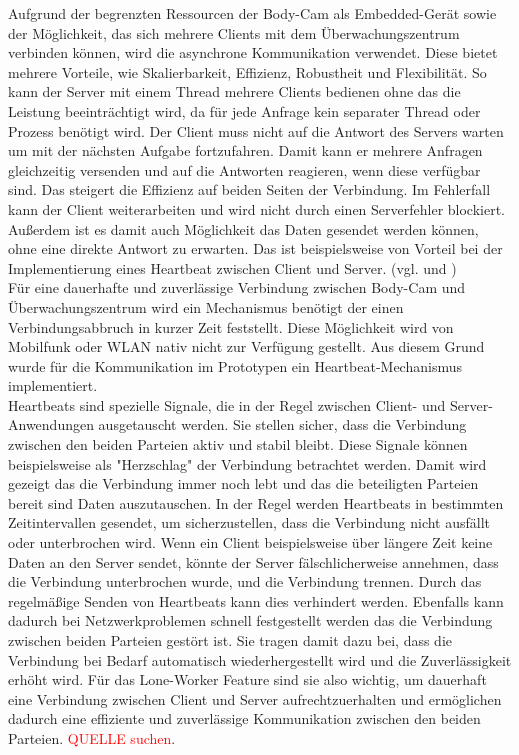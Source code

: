 \documentclass[thesis.tex]{subfiles}
\begin{document}
Aufgrund der begrenzten Ressourcen der Body-Cam als Embedded-Gerät sowie der Möglichkeit, das sich mehrere Clients mit dem Überwachungszentrum verbinden können, wird die asynchrone Kommunikation verwendet.
Diese bietet mehrere Vorteile, wie Skalierbarkeit, Effizienz, Robustheit und Flexibilität.
So kann der Server mit einem Thread mehrere Clients bedienen ohne das die Leistung beeinträchtigt wird, da für jede Anfrage kein separater Thread oder Prozess benötigt wird.
Der Client muss nicht auf die Antwort des Servers warten um mit der nächsten Aufgabe fortzufahren.
Damit kann er mehrere Anfragen gleichzeitig versenden und auf die Antworten reagieren, wenn diese verfügbar sind.
Das steigert die Effizienz auf beiden Seiten der Verbindung.
Im Fehlerfall kann der Client weiterarbeiten und wird nicht durch einen Serverfehler blockiert.
Außerdem ist es damit auch Möglichkeit das Daten gesendet werden können, ohne eine direkte Antwort zu erwarten.
Das ist beispielsweise von Vorteil bei der Implementierung eines Heartbeat zwischen Client und Server.
(vgl. \cite[]{whyAsync} und \cite[]{thinkAsync})
\\

Für eine dauerhafte und zuverlässige Verbindung zwischen Body-Cam und Überwachungszentrum wird ein Mechanismus benötigt der einen Verbindungsabbruch in kurzer Zeit feststellt.
Diese Möglichkeit wird von Mobilfunk oder WLAN nativ nicht zur Verfügung gestellt.
Aus diesem Grund wurde für die Kommunikation im Prototypen ein Heartbeat-Mechanismus implementiert.
\\

Heartbeats sind spezielle Signale, die in der Regel zwischen Client- und Server-Anwendungen ausgetauscht werden.
Sie stellen sicher, dass die Verbindung zwischen den beiden Parteien aktiv und stabil bleibt.
Diese Signale können beispielsweise als "Herzschlag" der Verbindung betrachtet werden.
Damit wird gezeigt das die Verbindung immer noch lebt und das die beteiligten Parteien bereit sind Daten auszutauschen.
In der Regel werden Heartbeats in bestimmten Zeitintervallen gesendet, um sicherzustellen, dass die Verbindung nicht ausfällt oder unterbrochen wird.
Wenn ein Client beispielsweise über längere Zeit keine Daten an den Server sendet, könnte der Server fälschlicherweise annehmen, dass die Verbindung unterbrochen wurde, und die Verbindung trennen.
Durch das regelmäßige Senden von Heartbeats kann dies verhindert werden.
Ebenfalls kann dadurch bei Netzwerkproblemen schnell festgestellt werden das die Verbindung zwischen beiden Parteien gestört ist.
Sie tragen damit dazu bei, dass die Verbindung bei Bedarf automatisch wiederhergestellt wird und die Zuverlässigkeit erhöht wird.
Für das Lone-Worker Feature sind sie also wichtig, um dauerhaft eine Verbindung zwischen Client und Server aufrechtzuerhalten und ermöglichen dadurch eine effiziente und zuverlässige Kommunikation zwischen den beiden Parteien.
\textcolor{red}{QUELLE suchen}.
\\
\end{document}

